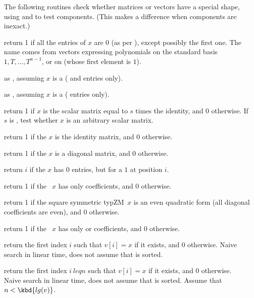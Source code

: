 
The following routines check whether matrices or vectors have a special
shape, using  and  to test components. (This makes
a difference when components are inexact.)

 return 1 if all the entries of $x$ are $0$
(as per ), except possibly the first one. The name comes from
vectors expressing polynomials on the standard basis $1,T,\dots, T^{n-1}$, or
on  (whose first element is $1$).

 as , assuming $x$ is a
 ( and  entries only).

 as , assuming $x$ is a
 ( entries only).

 return 1 if $x$ is the scalar matrix
equal to $s$ times the identity, and 0 otherwise. If $s$ is , test
whether $x$ is an arbitrary scalar matrix.

 return 1 if the  $x$ is the
identity matrix, and 0 otherwise.

 return 1 if the  $x$ is a
diagonal matrix, and 0 otherwise.

 return $i$ if the  $x$ has $0$ entries,
but for a $1$ at position $i$.

 return 1 if the ~$x$ has only
 coefficients, and 0 otherwise.

 return 1 if the square symmetric typ{ZM}~$x$
is an even quadratic form (all diagonal coefficients are even), and 0 otherwise.

 return 1 if the ~$x$ has only
 or  coefficients, and 0 otherwise.

 return the first index $i$ such that
$v[i] = x$ if it exists, and $0$ otherwise. Naive search in linear time, does
not assume that  is sorted.

 return the first index $i\ leq n$
such that $v[i] = x$ if it exists, and $0$ otherwise. Naive search in linear
time, does not assume that  is sorted. Assume that $n < \kbd{lg(v)}$.


